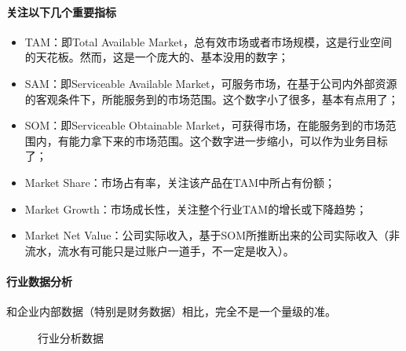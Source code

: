 \documentclass[letterpaper,11pt,english]{sphinxmanual}
\begin{document}
\paragraph{关注以下几个重要指标}
\label{\detokenize{chapter_skill/industry_analysis:id8}}\begin{itemize}
\item {} 
TAM：即Total Available
Market，总有效市场或者市场规模，这是行业空间的天花板。然而，这是一个庞大的、基本没用的数字；

\item {} 
SAM：即Serviceable Available
Market，可服务市场，在基于公司内外部资源的客观条件下，所能服务到的市场范围。这个数字小了很多，基本有点用了；

\item {} 
SOM：即Serviceable Obtainable
Market，可获得市场，在能服务到的市场范围内，有能力拿下来的市场范围。这个数字进一步缩小，可以作为业务目标了；

\item {} 
Market Share：市场占有率，关注该产品在TAM中所占有份额；

\item {} 
Market Growth：市场成长性，关注整个行业TAM的增长或下降趋势；

\item {} 
Market Net
Value：公司实际收入，基于SOM所推断出来的公司实际收入（非流水，流水有可能只是过账户一道手，不一定是收入）。

\end{itemize}


\paragraph{行业数据分析}
\label{\detokenize{chapter_skill/industry_analysis:id9}}
和企业内部数据（特别是财务数据）相比，完全不是一个量级的准。

\begin{figure}[H]
\centering
\capstart

\noindent{}
\caption{行业分析数据}\label{\detokenize{chapter_skill/industry_analysis:id14}}\end{figure}
\end{document}
